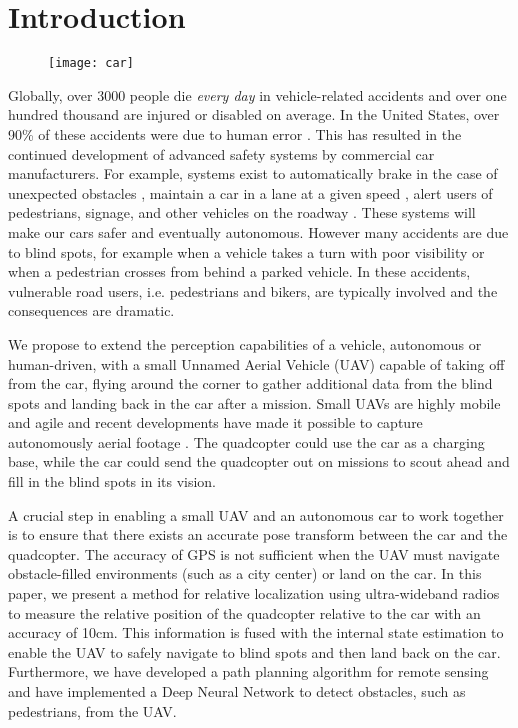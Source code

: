 
\section{Introduction}

\begin{figure}
    \centering

    \texttt{[image: car]}

\end{figure}

Globally, over 3000 people die \emph{every day} \cite{ASIR2016} in vehicle-related accidents and over one hundred thousand are injured or disabled on average.
In the United States, over 90\% of these accidents were due to human error \cite{NHTSA_crash_stats}.
This has resulted in the continued development of advanced safety systems by commercial car manufacturers.
For example, systems exist to automatically brake in the case of unexpected obstacles \cite{Toyota_patent}, maintain a car in a lane at a given speed \cite{bradley2016tesla}, alert users of pedestrians, signage, and other vehicles on the roadway \cite{Dagan_IVS_2004}. These systems will make our cars safer and eventually autonomous.
However many accidents are due to blind spots, for example when a vehicle takes a turn with poor visibility or when a pedestrian crosses from behind a parked vehicle. In these accidents, vulnerable road users, i.e. pedestrians and bikers, are typically involved and the consequences are dramatic.

We propose to extend the perception capabilities of a vehicle, autonomous or human-driven, with a small Unnamed Aerial Vehicle (UAV) capable of taking off from the car, flying around the corner to gather additional data from the blind spots and landing back in the car after a mission. Small UAVs are highly mobile and agile and recent developments have made it possible to capture autonomously aerial footage \cite{naegeli17letters}.
The quadcopter could use the car as a charging base,
while the car could send the quadcopter out on missions to scout ahead and
fill in the blind spots in its vision.

A crucial step in enabling a small UAV and an autonomous car to work
together is to ensure that there exists an accurate pose transform between the car
and the quadcopter. The accuracy of GPS is not sufficient when the UAV must navigate
obstacle-filled environments (such as a city center) or land on the car. In this 
paper, we present a method for relative localization using ultra-wideband radios to measure the relative position of the quadcopter relative to the car with an accuracy of 10cm. This information is fused with the internal state estimation to enable the UAV to safely navigate to blind spots and then land back on the car. Furthermore, we have developed a path planning algorithm for remote sensing and have implemented a Deep Neural Network to detect obstacles, such as pedestrians, from the UAV.


